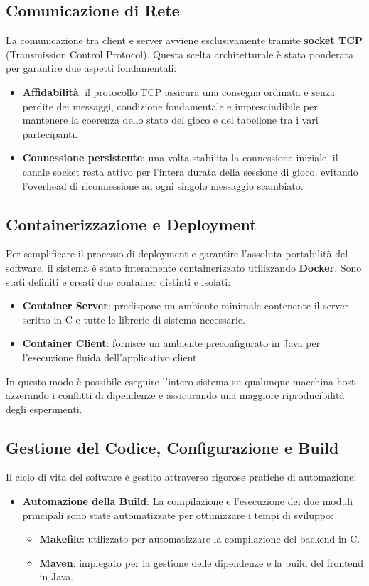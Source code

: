 \documentclass[11pt, a4paper]{article}
\begin{document}
\subsection{Comunicazione di Rete}
La comunicazione tra client e server avviene esclusivamente tramite \textbf{socket TCP} (Transmission Control Protocol). Questa scelta architetturale è stata ponderata per garantire due aspetti fondamentali:
\begin{itemize}
    \item \textbf{Affidabilità}: il protocollo TCP assicura una consegna ordinata e senza perdite dei messaggi, condizione fondamentale e imprescindibile per mantenere la coerenza dello stato del gioco e del tabellone tra i vari partecipanti.
    \item \textbf{Connessione persistente}: una volta stabilita la connessione iniziale, il canale socket resta attivo per l'intera durata della sessione di gioco, evitando l'overhead di riconnessione ad ogni singolo messaggio scambiato.
\end{itemize}

\subsection{Containerizzazione e Deployment}
Per semplificare il processo di deployment e garantire l'assoluta portabilità del software, il sistema è stato interamente containerizzato utilizzando \textbf{Docker}. Sono stati definiti e creati due container distinti e isolati:
\begin{itemize}
    \item \textbf{Container Server}: predispone un ambiente minimale contenente il server scritto in C e tutte le librerie di sistema necessarie.
    \item \textbf{Container Client}: fornisce un ambiente preconfigurato in Java per l'esecuzione fluida dell'applicativo client.
\end{itemize}
In questo modo è possibile eseguire l'intero sistema su qualunque macchina host azzerando i conflitti di dipendenze e assicurando una maggiore riproducibilità degli esperimenti.

\subsection{Gestione del Codice, Configurazione e Build}
Il ciclo di vita del software è gestito attraverso rigorose pratiche di automazione:
\begin{itemize}
    \item \textbf{Automazione della Build}: La compilazione e l'esecuzione dei due moduli principali sono state automatizzate per ottimizzare i tempi di sviluppo:
    \begin{itemize}
        \item \textbf{Makefile}: utilizzato per automatizzare la compilazione del backend in C.
        \item \textbf{Maven}: impiegato per la gestione delle dipendenze e la build del frontend in Java.
    \end{itemize}
\end{itemize}
\end{document}
